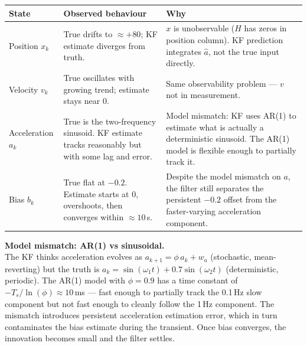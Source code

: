 \documentclass[12pt, a4paper]{article}
\begin{document}
\begin{center}
\renewcommand{\arraystretch}{1.5}
\begin{tabular}{p{2.2cm} p{5.5cm} p{6cm}}
  \toprule
  \textbf{State} & \textbf{Observed behaviour} & \textbf{Why} \\
  \midrule
  Position $x_k$ &
    True drifts to $\approx +80$; KF estimate diverges from truth. &
    $x$ is unobservable ($H$ has zeros in position column).
    KF prediction integrates $\hat{a}$, not the true input directly. \\
  Velocity $v_k$ &
    True oscillates with growing trend; estimate stays near 0. &
    Same observability problem --- $v$ not in measurement. \\
  Acceleration $a_k$ &
    True is the two-frequency sinusoid.
    KF estimate tracks reasonably but with some lag and error. &
    Model mismatch: KF uses AR(1) to estimate what is actually a
    deterministic sinusoid.
    The AR(1) model is flexible enough to partially track it. \\
  Bias $b_k$ &
    True flat at $-0.2$.
    Estimate starts at 0, overshoots, then converges within $\approx 10$\,s. &
    Despite the model mismatch on $a$, the filter still separates
    the persistent $-0.2$ offset from the faster-varying acceleration
    component. \\
  \bottomrule
\end{tabular}
\end{center}

\begin{notebox}
  \textbf{Model mismatch: AR(1) vs sinusoidal.}\\
  The KF thinks acceleration evolves as $a_{k+1} = \phi\,a_k + w_a$
  (stochastic, mean-reverting) but the truth is
  $a_k = \sin(\omega_1 t) + 0.7\sin(\omega_2 t)$ (deterministic, periodic).
  The AR(1) model with $\phi = 0.9$ has a time constant of
  $-T_s / \ln(\phi) \approx 10$\,ms --- fast enough to partially track
  the 0.1\,Hz slow component but not fast enough to cleanly follow
  the 1\,Hz component.
  The mismatch introduces persistent acceleration estimation error,
  which in turn contaminates the bias estimate during the transient.
  Once bias converges, the innovation becomes small and the filter settles.
\end{notebox}
\end{document}
